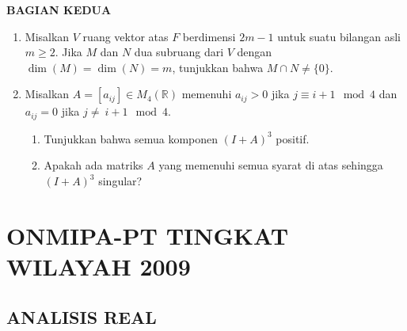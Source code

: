 \documentclass[12pt,twoside]{article}
\begin{document}
\newpage \textbf{BAGIAN KEDUA}
\begin{enumerate}
	\item Misalkan $V$ ruang vektor atas $F$ berdimensi $2m-1$ untuk suatu bilangan asli $m\geq 2$. Jika $M$ dan $N$ dua subruang dari $V$ dengan $\dim (M)=\dim(N)=m$, tunjukkan bahwa $M\cap N\neq\{0\}$.

	\item Misalkan $A=[a_{ij}]\in M_4(\mathbb{R})$ memenuhi $a_{ij}>0$ jika $j\equiv i+1\mod 4$ dan $a_{ij}=0$ jika $j\ne\ i+1\mod 4$.
	      \begin{enumerate}
		      \item Tunjukkan bahwa semua komponen $(I+A)^3$ positif.

		      \item Apakah ada matriks $A$ yang memenuhi semua syarat di atas sehingga $(I+A)^3$ singular?
	      \end{enumerate}
\end{enumerate}
\newpage




\section{ONMIPA-PT TINGKAT WILAYAH 2009}
\subsection{ANALISIS REAL}
\end{document}
